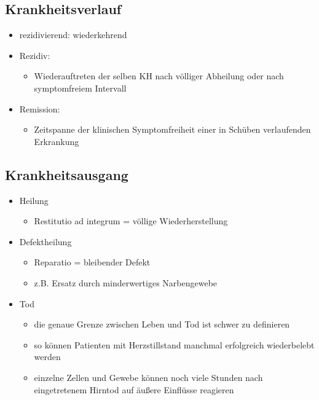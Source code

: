 \subsection{Krankheitsverlauf}
	\begin{itemize}
		\item rezidivierend: wiederkehrend
		\item Rezidiv:
			\begin{itemize}
				\item Wiederauftreten der selben KH nach völliger Abheilung oder nach symptomfreiem Intervall
			\end{itemize}
		\item Remission:
			\begin{itemize}
				\item Zeitspanne der klinischen Symptomfreiheit einer in Schüben verlaufenden Erkrankung
			\end{itemize}
	\end{itemize}

\subsection{Krankheitsausgang}
	\begin{itemize}
		\item Heilung
			\begin{itemize}
				\item Restitutio ad integrum = völlige Wiederherstellung
			\end{itemize}
		\item Defektheilung
			\begin{itemize}
				\item Reparatio = bleibender Defekt
				\item z.B. Ersatz durch minderwertiges Narbengewebe
			\end{itemize}
		\item Tod
			\begin{itemize}
				\item die genaue Grenze zwischen Leben und Tod ist schwer zu definieren
				\item so können Patienten mit Herzstillstand manchmal erfolgreich wiederbelebt werden
				\item einzelne Zellen und Gewebe können noch viele Stunden nach eingetretenem Hirntod auf äußere Einflüsse reagieren
			\end{itemize}
	\end{itemize}

